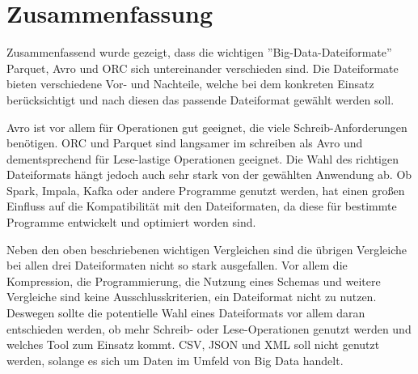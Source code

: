 \chapter{Zusammenfassung}
Zusammenfassend wurde gezeigt, dass die wichtigen ''Big-Data-Dateiformate'' Parquet, Avro und ORC sich untereinander verschieden sind. Die Dateiformate bieten verschiedene Vor- und Nachteile, welche bei dem konkreten Einsatz berücksichtigt und nach diesen das passende Dateiformat gewählt werden soll.

Avro ist vor allem für Operationen gut geeignet, die viele Schreib-Anforderungen benötigen. ORC und Parquet sind langsamer im schreiben als Avro und dementsprechend für Lese-lastige Operationen geeignet. Die Wahl des richtigen Dateiformats hängt jedoch auch sehr stark von der gewählten Anwendung ab. Ob Spark, Impala, Kafka oder andere Programme genutzt werden, hat einen großen Einfluss auf die Kompatibilität mit den Dateiformaten, da diese für bestimmte Programme entwickelt und optimiert worden sind. 

Neben den oben beschriebenen wichtigen Vergleichen sind die übrigen Vergleiche bei allen drei Dateiformaten nicht so stark ausgefallen. Vor allem die Kompression, die Programmierung, die Nutzung eines Schemas und weitere Vergleiche sind keine Ausschlusskriterien, ein Dateiformat nicht zu nutzen. Deswegen sollte die potentielle Wahl eines Dateiformats vor allem daran entschieden werden, ob mehr Schreib- oder Lese-Operationen genutzt werden und welches Tool zum Einsatz kommt. CSV, JSON und XML soll nicht genutzt werden, solange es sich um Daten im Umfeld von Big Data handelt.